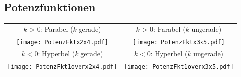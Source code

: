 \newpage
\keinHeaderUndKeinFooter{}

\subsection*{Potenzfunktionen}

\begin{tabular}{cc}
$k$ > 0: Parabel ($k$ gerade) & $k$ > 0: Parabel ($k$ ungerade)\\   %
  \texttt{[image: PotenzFktx2x4.pdf]} &
  \texttt{[image: PotenzFktx3x5.pdf]}\\

$k<0$: Hyperbel  ($k$ gerade) & $k<0$: Hyperbel ($k$ ungerade)\\
  \texttt{[image: PotenzFkt1overx2x4.pdf]}&
  \texttt{[image: PotenzFkt1overx3x5.pdf]}
  \end{tabular}


